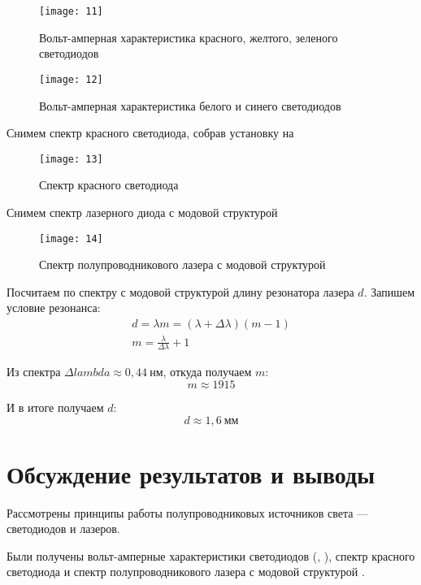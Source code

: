 \documentclass[a4paper, 12pt]{article}
\begin{document}
\begin{figure}[H]
    \texttt{[image: 11]} 
    \caption{Вольт-амперная характеристика красного, желтого, зеленого 
    светодиодов}
    \label{fig:11}
\end{figure}

\begin{figure}[H]
    \texttt{[image: 12]} 
    \caption{Вольт-амперная характеристика белого и синего
    светодиодов}
    \label{fig:12}
\end{figure}

Снимем спектр красного светодиода, собрав установку на  

\begin{figure}[H]
    \texttt{[image: 13]} 
    \caption{Спектр красного светодиода}
    \label{fig:13}
\end{figure}


Снимем спектр лазерного диода с модовой структурой

\begin{figure}[H]
    \texttt{[image: 14]} 
    \caption{Спектр полупроводникового лазера с модовой структурой}
    \label{fig:14}
\end{figure}

Посчитаем по спектру с модовой структурой длину резонатора лазера $d$.
Запишем условие резонанса:
\begin{equation*}
    \begin{gathered}
        d=\lambda m = (\lambda + \Delta \lambda)(m-1)\\
        m= \frac{\lambda}{\Delta \lambda}+1
    \end{gathered}
\end{equation*}

Из спектра $\Delta lambda \approx 0,44\: нм$, откуда получаем $m$:
\[
    m\approx 1915
\]

И в итоге получаем $d$:
\[
    d\approx 1,6\: мм
\]







\section{Обсуждение результатов и выводы}
Рассмотрены принципы работы полупроводниковых источников света ---
светодиодов и лазеров.

Были получены вольт-амперные характеристики светодиодов
(, ), спектр красного светодиода
 и спектр полупроводникового лазера с модовой структурой
.
\end{document}
